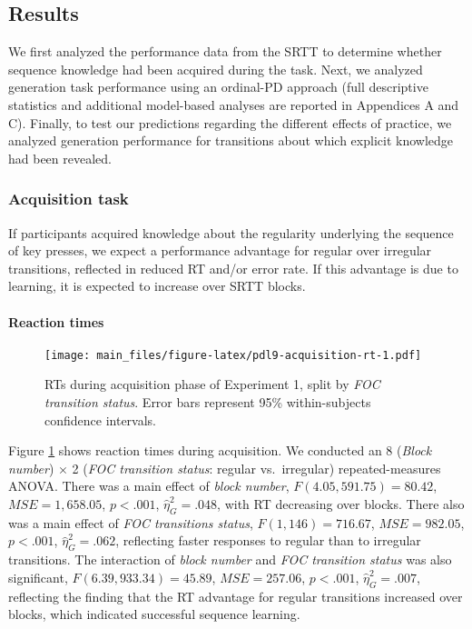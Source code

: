 \documentclass[man]{apa6}
\theoremstyle{definition}
\theoremstyle{definition}
\theoremstyle{definition}
\theoremstyle{remark}
\begin{document}
\subsection{Results}\label{results}

We first analyzed the performance data from the SRTT to determine
whether sequence knowledge had been acquired during the task. Next, we
analyzed generation task performance using an ordinal-PD approach (full
descriptive statistics and additional model-based analyses are reported
in Appendices A and C). Finally, to test our predictions regarding the
different effects of practice, we analyzed generation performance for
transitions about which explicit knowledge had been revealed.

\subsubsection{Acquisition task}\label{acquisition-task}

If participants acquired knowledge about the regularity underlying the
sequence of key presses, we expect a performance advantage for regular
over irregular transitions, reflected in reduced RT and/or error rate.
If this advantage is due to learning, it is expected to increase over
SRTT blocks.

\paragraph{Reaction times}\label{reaction-times}

\begin{figure}
\centering
\texttt{[image: main\_files/figure-latex/pdl9-acquisition-rt-1.pdf]}
\caption{\label{fig:pdl9-acquisition-rt}RTs during acquisition phase of
Experiment 1, split by \emph{FOC transition status}. Error bars
represent 95\% within-subjects confidence intervals.}
\end{figure}

Figure \ref{fig:pdl9-acquisition-rt} shows reaction times during
acquisition. We conducted an 8 (\emph{Block number}) \(\times\) 2
(\emph{FOC transition status}: regular vs.~irregular) repeated-measures
ANOVA. There was a main effect of \emph{block number},
\(F(4.05, 591.75) = 80.42\), \(\mathit{MSE} = 1,658.05\), \(p < .001\),
\(\hat{\eta}^2_G = .048\), with RT decreasing over blocks. There also
was a main effect of \emph{FOC transitions status},
\(F(1, 146) = 716.67\), \(\mathit{MSE} = 982.05\), \(p < .001\),
\(\hat{\eta}^2_G = .062\), reflecting faster responses to regular than
to irregular transitions. The interaction of \emph{block number} and
\emph{FOC transition status} was also significant,
\(F(6.39, 933.34) = 45.89\), \(\mathit{MSE} = 257.06\), \(p < .001\),
\(\hat{\eta}^2_G = .007\), reflecting the finding that the RT advantage
for regular transitions increased over blocks, which indicated
successful sequence learning.
\end{document}
